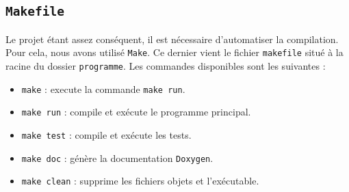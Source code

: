 \subsection{\texttt{Makefile}}

Le projet étant assez conséquent, il est nécessaire d'automatiser la compilation.
Pour cela, nous avons utilisé \texttt{Make}.
Ce dernier vient le fichier \texttt{makefile} situé à la racine du dossier \texttt{programme}.
Les commandes disponibles sont les suivantes :
\begin{itemize}
    \item \texttt{make} : execute la commande \texttt{make run}.
    \item \texttt{make run} : compile et exécute le programme principal.
    \item \texttt{make test} : compile et exécute les tests.
    \item \texttt{make doc} : génère la documentation \texttt{Doxygen}.
    \item \texttt{make clean} : supprime les fichiers objets et l'exécutable.
\end{itemize}